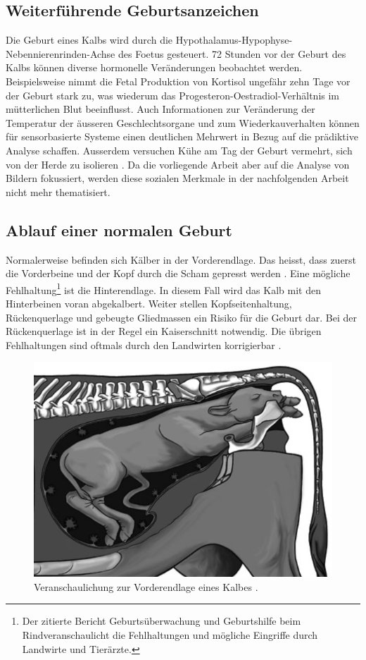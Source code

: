\subsection{Weiterführende Geburtsanzeichen}
Die Geburt eines Kalbs wird durch die \gls{Hypothalamus}-\gls{Hypophyse}-Nebennierenrinden-Achse des \gls{Foetus} gesteuert. 72 Stunden vor der Geburt des Kalbs können diverse hormonelle Veränderungen beobachtet werden. Beispielsweise nimmt die \gls{Fetal} Produktion von Kortisol ungefähr zehn Tage vor der Geburt stark zu, was wiederum das \gls{Progesteron}-\gls{Oestradiol}-Verhältnis im mütterlichen Blut beeinflusst. Auch Informationen zur Veränderung der Temperatur der äusseren Geschlechtsorgane und zum Wiederkauverhalten können für sensorbasierte Systeme einen deutlichen Mehrwert in Bezug auf die prädiktive Analyse schaffen. Ausserdem versuchen Kühe am Tag der Geburt vermehrt, sich von der Herde zu isolieren \citep[S.1-4]{Saint-Dizier2015}. 
Da die vorliegende Arbeit aber auf die Analyse von Bildern fokussiert, werden diese sozialen Merkmale in der nachfolgenden Arbeit nicht mehr thematisiert. 
\subsection{Ablauf einer normalen Geburt}
Normalerweise befinden sich Kälber in der Vorderendlage. Das heisst, dass zuerst die Vorderbeine und der Kopf durch die Scham gepresst werden \citep{Muller2020}. Eine mögliche Fehlhaltung\footnote{Der zitierte Bericht \flqq Geburtsüberwachung und Geburtshilfe beim Rind\frqq veranschaulicht die Fehlhaltungen und mögliche Eingriffe durch Landwirte und Tierärzte.} ist die Hinterendlage. In diesem Fall wird das Kalb mit den Hinterbeinen voran abgekalbert. Weiter stellen Kopfseitenhaltung, Rückenquerlage und gebeugte Gliedmassen ein Risiko für die Geburt dar. Bei der Rückenquerlage ist in der Regel ein Kaiserschnitt notwendig. Die übrigen Fehlhaltungen sind oftmals durch den Landwirten korrigierbar \citep[S. 17, 24-26]{Traulsen2013}.

\begin{figure}[H]
	\center
	\includegraphics[scale=.45]{Grafiken/vorderendlage.png}
	\caption{Veranschaulichung zur Vorderendlage eines Kalbes \citep[S. 17]{Traulsen2013}.}
	\label{fig: Schwanzhebung}
\end{figure}

